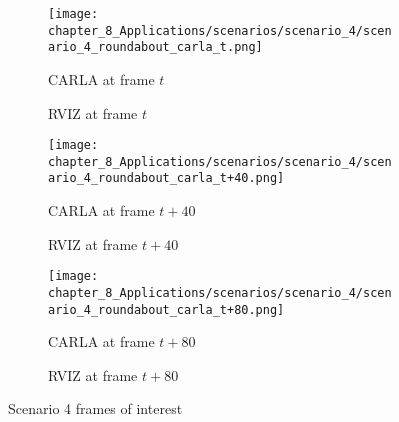 \begin{figure}[t!]
	\begin{subfigure}{0.48\textwidth}
		\texttt{[image: chapter\_8\_Applications/scenarios/scenario\_4/scenario\_4\_roundabout\_carla\_t.png]}
		\caption{\ac{CARLA} at frame $t$}
		\label{subfig:chapter_8_Applications/scenarios/scenario_4/scenario_4_roundabout_carla_t.png}
	\end{subfigure}
	\hfill 
	\begin{subfigure}{0.48\textwidth}
		\caption{\ac{RVIZ} at frame $t$}
		\label{subfig:chapter_8_Applications/scenarios/scenario_4/scenario_4_roundabout_rviz_t}
	\end{subfigure}
	\tabularnewline
	\begin{subfigure}{0.48\textwidth}
		\texttt{[image: chapter\_8\_Applications/scenarios/scenario\_4/scenario\_4\_roundabout\_carla\_t+40.png]}
		\caption{\ac{CARLA} at frame $t+40$}
		\label{subfig:chapter_8_Applications/scenarios/scenario_4/scenario_4_roundabout_carla_t+40.png}
	\end{subfigure}
	\hfill 
	\begin{subfigure}{0.48\textwidth}
		\caption{\ac{RVIZ} at frame $t+40$}
		\label{subfig:chapter_8_Applications/scenarios/scenario_4/scenario_4_roundabout_rviz_t+40}
	\end{subfigure}
	\tabularnewline
	\begin{subfigure}{0.48\textwidth}
		\texttt{[image: chapter\_8\_Applications/scenarios/scenario\_4/scenario\_4\_roundabout\_carla\_t+80.png]}
		\caption{\ac{CARLA} at frame $t+80$}
		\label{subfig:chapter_8_Applications/scenarios/scenario_4/scenario_4_roundabout_carla_t+80}
	\end{subfigure}
	\hfill
	\begin{subfigure}{0.48\textwidth}
		\caption{\ac{RVIZ} at frame $t+80$}
		\label{subfig:chapter_8_Applications/scenarios/scenario_4/scenario_4_roundabout_rviz_t+80}
	\end{subfigure}
	\tabularnewline
	\caption{Scenario 4 frames of interest}
	\label{fig:chapter_8_Applications/scenarios/scenario_4_frames_of_interest}
\end{figure}